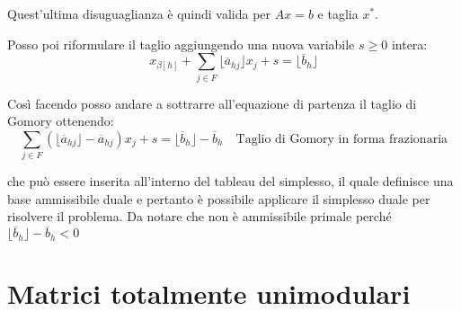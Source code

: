 \begin{itemize}
	Quest'ultima disuguaglianza è quindi valida per $Ax = b$ e taglia $x^*$.
	
	Posso poi riformulare il taglio aggiungendo una nuova variabile $s\geq 0$ intera:
	$$
	 x_{\beta[h]} + \sum_{j \in F} \lfloor \overline{a}_{hj} \rfloor x_j + s =  \lfloor \overline{b}_h\rfloor
	$$
	
	Così facendo posso andare a sottrarre all'equazione di partenza il taglio di Gomory ottenendo:
	$$
	\sum_{j\in F}(\lfloor \overline{a}_{hj} \rfloor-  \overline{a}_{hj})x_j + s = \lfloor \overline{b}_h\rfloor -\overline{b}_h \quad \text{Taglio di Gomory in forma frazionaria}
	$$
	
	che può essere inserita all'interno del tableau del simplesso, il quale definisce una base ammissibile duale e pertanto è possibile applicare il simplesso duale per risolvere il problema. Da notare che non è ammissibile primale perché $\lfloor \overline{b}_h\rfloor -\overline{b}_h < 0$ 
\end{itemize}


\section{Matrici totalmente unimodulari}

